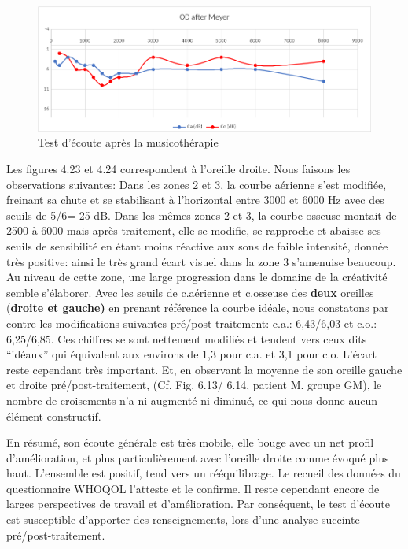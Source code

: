  	\begin{figure}[h]
 		\centering

 		\includegraphics[width=0.7\linewidth]{images/clinique/od_after_meyer.png}
 		\caption{Test d'écoute après la musicothérapie}
 		\label{fig:odaftermeyer}
 	\end{figure}
 Les figures 4.23 et 4.24 correspondent à l'oreille droite. 
        Nous faisons les observations suivantes:
      Dans les
        zones 2 et 3,  la courbe aérienne s'est modifiée, freinant sa
        chute et se stabilisant à l'horizontal entre 3000 et 6000 Hz
        avec des seuils de 5/6= 25 dB.
        Dans les mêmes zones 2 et 3, la
        courbe osseuse montait de 2500 à 6000 mais après traitement,
        elle se modifie, se rapproche et abaisse ses seuils de
        sensibilité en étant moins réactive aux sons de faible
        intensité, donnée très positive: ainsi le très grand écart visuel dans la zone 3 s'amenuise beaucoup. Au niveau de cette
        zone, une large progression dans
  le domaine de la créativité semble s'élaborer.
Avec les
  seuils 
   de c.aérienne et c.osseuse des\textbf{ deux} oreilles (\textbf{droite et gauche)} en prenant
   référence la courbe idéale, nous
  constatons par contre les modifications suivantes pré/post-traitement:
  c.a.: 6,43/6,03 et c.o.: 6,25/6,85.
  Ces chiffres se sont nettement
  modifiés et tendent vers
  ceux dits ``idéaux''  qui équivalent aux environs de 1,3 pour
  c.a. et 3,1 pour c.o. L'écart reste cependant très important. %
  Et, en observant la moyenne de son oreille gauche et droite
  pré/post-traitement, (Cf. Fig. 6.13/ 6.14, patient M. groupe GM), le
  nombre de croisements n'a ni augmenté ni diminué, ce qui nous donne
  aucun élément constructif.
  
  En résumé, son écoute générale est très mobile, elle bouge avec un
  net profil d'amélioration, et plus particulièrement avec l'oreille
  droite comme évoqué plus haut. L'ensemble est positif, tend vers un
  rééquilibrage. Le recueil des données du
  questionnaire WHOQOL l'atteste et le confirme. 
  Il reste cependant encore de larges perspectives de travail et d'amélioration.
  Par conséquent, le test d'écoute est susceptible d'apporter des renseignements, lors
      d'une analyse succinte pré/post-traitement.

